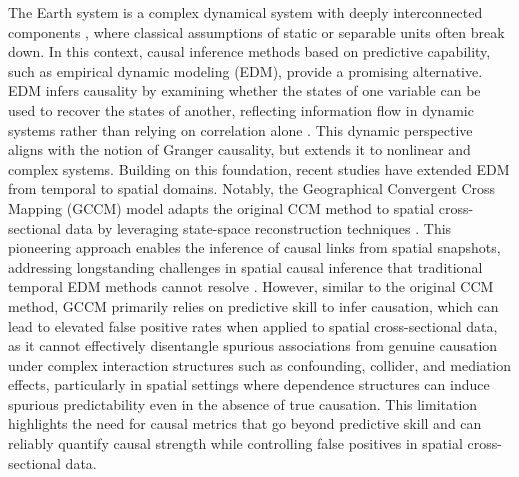 \documentclass[authoryear,preprint,review,12pt]{elsarticle}
\begin{document}
The Earth system is a complex dynamical system with deeply interconnected components \citep{runge2019esstsc,runge2023tsc}, where classical assumptions of static or separable units often break down. In this context, causal inference methods based on predictive capability, such as empirical dynamic modeling (EDM), provide a promising alternative. EDM infers causality by examining whether the states of one variable can be used to recover the states of another, reflecting information flow in dynamic systems rather than relying on correlation alone \citep{sugihara2012ccm,leng2020pcm,lyu2026tEDM}. This dynamic perspective aligns with the notion of Granger causality, but extends it to nonlinear and complex systems. Building on this foundation, recent studies have extended EDM from temporal to spatial domains. Notably, the Geographical Convergent Cross Mapping (GCCM) model adapts the original CCM method \citep{sugihara2012ccm} to spatial cross-sectional data by leveraging state-space reconstruction techniques \citep{lorenz1969ssr,Takens1981embedding,Mane1981embedding}. This pioneering approach enables the inference of causal links from spatial snapshots, addressing longstanding challenges in spatial causal inference that traditional temporal EDM methods cannot resolve \citep{gao2022tscess,gao2023gccm}. However, similar to the original CCM method, GCCM primarily relies on predictive skill to infer causation, which can lead to elevated false positive rates when applied to spatial cross-sectional data, as it cannot effectively disentangle spurious associations from genuine causation under complex interaction structures such as confounding, collider, and mediation effects, particularly in spatial settings where dependence structures can induce spurious predictability even in the absence of true causation. This limitation highlights the need for causal metrics that go beyond predictive skill and can reliably quantify causal strength while controlling false positives in spatial cross-sectional data.
\end{document}
